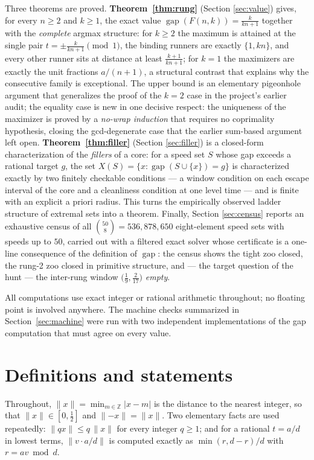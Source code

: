 \documentclass[11pt,a4paper]{article}
\theoremstyle{plain}
\theoremstyle{definition}
\theoremstyle{remark}
\newcommand{\norm}[1]{\lVert #1 \rVert}
\newcommand{\gap}{\operatorname{gap}}
\newcommand{\Z}{\mathbb{Z}}
\begin{document}
Three theorems are proved. \textbf{Theorem~\ref{thm:rung}} (Section
\ref{sec:value}) gives, for every $n \ge 2$ and $k \ge 1$, the exact value
$\gap(F(n,k)) = \tfrac{k}{kn+1}$ together with the \emph{complete} argmax
structure: for $k \ge 2$ the maximum is attained at the single pair
$t = \pm \tfrac{k}{kn+1} \pmod 1$, the binding runners are exactly
$\{1, kn\}$, and every other runner sits at distance at least
$\tfrac{k+1}{kn+1}$; for $k = 1$ the maximizers are exactly the unit
fractions $a/(n+1)$, a structural contrast that explains why the consecutive
family is exceptional. The upper bound is an elementary pigeonhole argument
that generalizes the proof of the $k=2$ case in the project's earlier audit;
the equality case is new in one decisive respect: the uniqueness of the
maximizer is proved by a \emph{no-wrap induction} that requires no
coprimality hypothesis, closing the gcd-degenerate case that the earlier
sum-based argument left open. \textbf{Theorem~\ref{thm:filler}} (Section
\ref{sec:filler}) is a closed-form characterization of the \emph{fillers} of
a core: for a speed set $S$ whose gap exceeds a rational target $g$, the set
$X(S) = \{x : \gap(S \cup \{x\}) = g\}$ is characterized exactly by two
finitely checkable conditions --- a window condition on each escape interval
of the core and a cleanliness condition at one level time --- and is finite
with an explicit a priori radius. This turns the empirically observed
ladder structure of extremal sets into a theorem. Finally, Section
\ref{sec:census} reports an exhaustive census of all
$\binom{50}{8} = 536{,}878{,}650$ eight-element speed sets with speeds up to
$50$, carried out with a filtered exact solver whose certificate is a
one-line consequence of the definition of $\gap$: the census shows the tight
zoo closed, the rung-2 zoo closed in primitive structure, and --- the target
question of the hunt --- the inter-rung window $\bigl(\tfrac19,
\tfrac{2}{17}\bigr)$ \emph{empty}.

All computations use exact integer or rational arithmetic throughout; no
floating point is involved anywhere. The machine checks summarized in
Section~\ref{sec:machine} were run with two independent implementations of
the gap computation that must agree on every value.

\section{Definitions and statements}\label{sec:statements}

Throughout, $\norm{x} = \min_{m \in \Z} |x - m|$ is the distance to the
nearest integer, so that $\norm{x} \in [0, \tfrac12]$ and
$\norm{-x} = \norm{x}$. Two elementary facts are used repeatedly:
$\norm{qx} \le q\,\norm{x}$ for every integer $q \ge 1$; and for a rational
$t = a/d$ in lowest terms, $\norm{v \cdot a/d}$ is computed exactly as
$\min(r, d-r)/d$ with $r = av \bmod d$.
\end{document}
